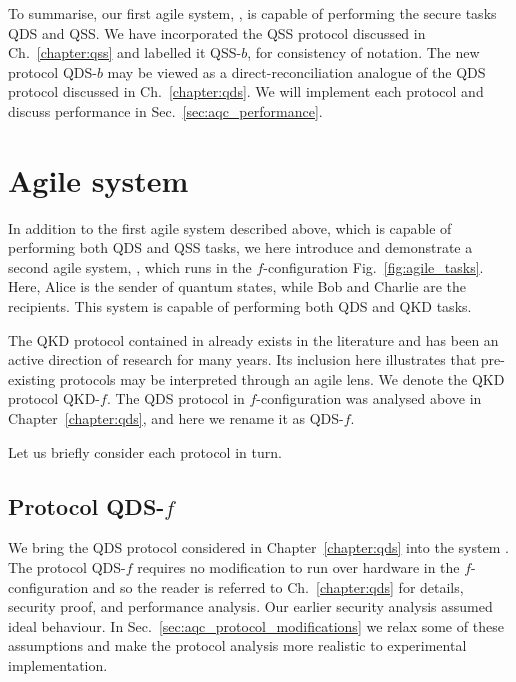 To summarise, our first agile system, \systemB, is capable of performing the secure tasks QDS and QSS. We have incorporated the QSS protocol discussed in Ch.~\ref{chapter:qss} and labelled it QSS-$b$, for consistency of notation. The new protocol QDS-$b$ may be viewed as a direct-reconciliation analogue of the QDS protocol discussed in Ch.~\ref{chapter:qds}. We will implement each protocol and discuss performance in Sec.~\ref{sec:aqc_performance}.

\section{Agile system \systemF}\label{sec:aqc_systemf}

In addition to the first agile system described above, which is capable of performing both QDS and QSS tasks, we here introduce and demonstrate a second agile system, \systemF, which runs in the $f$-configuration Fig.~\ref{fig:agile_tasks}. Here, Alice is the sender of quantum states, while Bob and Charlie are the recipients. This system is capable of performing both QDS and QKD tasks.

The QKD protocol contained in \systemF \; already exists in the literature \cite{Leverrier2011, Papanastasiou2018} and has been an active direction of research for many years. Its inclusion here illustrates that pre-existing protocols may be interpreted through an agile lens. We denote the QKD protocol QKD-$f$. The QDS protocol in $f$-configuration was analysed above in Chapter~\ref{chapter:qds}, and here we rename it as QDS-$f$.

Let us briefly consider each protocol in turn.

\subsection{Protocol QDS-$f$}
We bring the QDS protocol considered in Chapter~\ref{chapter:qds} into the system \systemF. The protocol QDS-$f$ requires no modification to run over hardware in the $f$-configuration and so the reader is referred to Ch.~\ref{chapter:qds} for details, security proof, and performance analysis. Our earlier security analysis assumed ideal behaviour. In Sec.~\ref{sec:aqc_protocol_modifications} we relax some of these assumptions and make the protocol analysis more realistic to experimental implementation.


